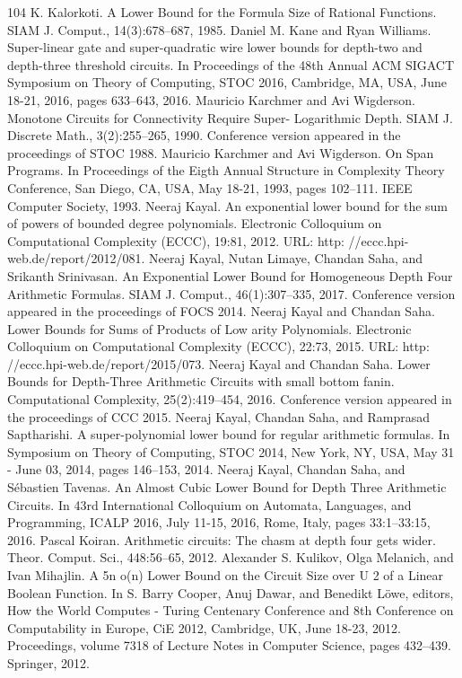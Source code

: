 \documentclass[10pt,a4paper]{article}
\begin{document}
\begin{thebibliography}{104}
 K. Kalorkoti. A Lower Bound for the Formula Size of Rational Functions. SIAM J. Comput., 14(3):678–687, 1985.
 Daniel M. Kane and Ryan Williams. Super-linear gate and super-quadratic wire lower bounds for depth-two and depth-three threshold circuits. In Proceedings of the 48th Annual ACM SIGACT Symposium on Theory of Computing, STOC 2016, Cambridge, MA, USA, June 18-21, 2016, pages 633–643, 2016.
 Mauricio Karchmer and Avi Wigderson. Monotone Circuits for Connectivity Require Super- Logarithmic Depth. SIAM J. Discrete Math., 3(2):255–265, 1990. Conference version appeared in the proceedings of STOC 1988.
 Mauricio Karchmer and Avi Wigderson. On Span Programs. In Proceedings of the Eigth Annual Structure in Complexity Theory Conference, San Diego, CA, USA, May 18-21, 1993, pages 102–111. IEEE Computer Society, 1993.
 Neeraj Kayal. An exponential lower bound for the sum of powers of bounded degree polynomials. Electronic Colloquium on Computational Complexity (ECCC), 19:81, 2012. URL: http: //eccc.hpi-web.de/report/2012/081.
 Neeraj Kayal, Nutan Limaye, Chandan Saha, and Srikanth Srinivasan. An Exponential Lower Bound for Homogeneous Depth Four Arithmetic Formulas. SIAM J. Comput., 46(1):307–335, 2017. Conference version appeared in the proceedings of FOCS 2014.
 Neeraj Kayal and Chandan Saha. Lower Bounds for Sums of Products of Low arity Polynomials. Electronic Colloquium on Computational Complexity (ECCC), 22:73, 2015. URL: http: //eccc.hpi-web.de/report/2015/073.
 Neeraj Kayal and Chandan Saha. Lower Bounds for Depth-Three Arithmetic Circuits with small bottom fanin. Computational Complexity, 25(2):419–454, 2016. Conference version appeared in the proceedings of CCC 2015.
 Neeraj Kayal, Chandan Saha, and Ramprasad Saptharishi. A super-polynomial lower bound for regular arithmetic formulas. In Symposium on Theory of Computing, STOC 2014, New York, NY, USA, May 31 - June 03, 2014, pages 146–153, 2014.
 Neeraj Kayal, Chandan Saha, and Sébastien Tavenas. An Almost Cubic Lower Bound for Depth Three Arithmetic Circuits. In 43rd International Colloquium on Automata, Languages, and Programming, ICALP 2016, July 11-15, 2016, Rome, Italy, pages 33:1–33:15, 2016.
 Pascal Koiran. Arithmetic circuits: The chasm at depth four gets wider. Theor. Comput. Sci., 448:56–65, 2012.
 Alexander S. Kulikov, Olga Melanich, and Ivan Mihajlin. A 5n o(n) Lower Bound on the Circuit Size over U 2 of a Linear Boolean Function. In S. Barry Cooper, Anuj Dawar, and Benedikt Löwe, editors, How the World Computes - Turing Centenary Conference and 8th Conference on Computability in Europe, CiE 2012, Cambridge, UK, June 18-23, 2012. Proceedings, volume 7318 of Lecture Notes in Computer Science, pages 432–439. Springer, 2012.

\end{thebibliography}
\end{document}
